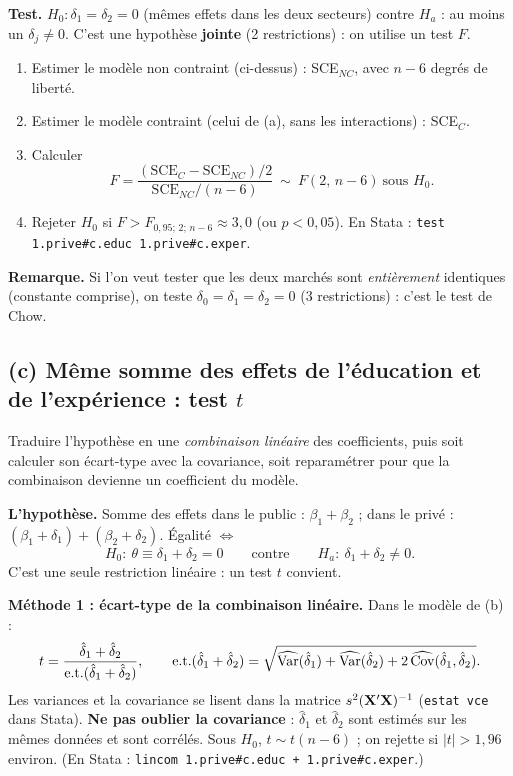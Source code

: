 \documentclass[11pt,a4paper]{article}
\begin{document}
\textbf{Test.} $H_0:\delta_1=\delta_2=0$ (mêmes effets dans les deux secteurs) contre $H_a$ : au moins un $\delta_j\neq0$. C'est une hypothèse \textbf{jointe} (2 restrictions) : on utilise un test $F$.
\begin{enumerate}[nosep]
\item Estimer le modèle non contraint (ci-dessus) : SCE$_{NC}$, avec $n-6$ degrés de liberté.
\item Estimer le modèle contraint (celui de (a), sans les interactions) : SCE$_C$.
\item Calculer
\[
F=\frac{(\text{SCE}_C-\text{SCE}_{NC})/2}{\text{SCE}_{NC}/(n-6)}\ \sim\ F(2,\,n-6)\ \text{sous } H_0 .
\]
\item Rejeter $H_0$ si $F>F_{0{,}95;\,2;\,n-6}\approx3{,}0$ (ou $p<0{,}05$). En Stata : \texttt{test 1.prive\#c.educ 1.prive\#c.exper}.
\end{enumerate}
\textbf{Remarque.} Si l'on veut tester que les deux marchés sont \emph{entièrement} identiques (constante comprise), on teste $\delta_0=\delta_1=\delta_2=0$ (3 restrictions) : c'est le test de Chow.

\subsection*{(c) Même somme des effets de l'éducation et de l'expérience : test $t$}

\begin{idee}
Traduire l'hypothèse en une \emph{combinaison linéaire} des coefficients, puis soit calculer son écart-type avec la covariance, soit reparamétrer pour que la combinaison devienne un coefficient du modèle.
\end{idee}

\textbf{L'hypothèse.} Somme des effets dans le public : $\beta_1+\beta_2$ ; dans le privé : $(\beta_1+\delta_1)+(\beta_2+\delta_2)$. Égalité $\iff$
\[
H_0:\ \theta\equiv\delta_1+\delta_2=0\qquad\text{contre}\qquad H_a:\ \delta_1+\delta_2\neq0 .
\]
C'est une seule restriction linéaire : un test $t$ convient.

\textbf{Méthode 1 : écart-type de la combinaison linéaire.} Dans le modèle de (b) :
\[
t=\frac{\hat\delta_1+\hat\delta_2}{\text{e.t.}(\hat\delta_1+\hat\delta_2)},\qquad
\text{e.t.}(\hat\delta_1+\hat\delta_2)=\sqrt{\widehat{\operatorname{Var}}(\hat\delta_1)+\widehat{\operatorname{Var}}(\hat\delta_2)+2\,\widehat{\operatorname{Cov}}(\hat\delta_1,\hat\delta_2)} .
\]
Les variances et la covariance se lisent dans la matrice $s^2(\mathbf{X}'\mathbf{X})^{-1}$ (\texttt{estat vce} dans Stata). \textbf{Ne pas oublier la covariance} : $\hat\delta_1$ et $\hat\delta_2$ sont estimés sur les mêmes données et sont corrélés. Sous $H_0$, $t\sim t(n-6)$ ; on rejette si $|t|>1{,}96$ environ. (En Stata : \texttt{lincom 1.prive\#c.educ + 1.prive\#c.exper}.)
\end{document}
